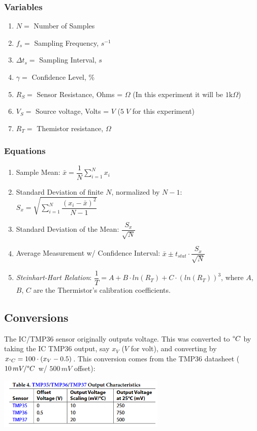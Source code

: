 \documentclass{article}
\begin{document}
\subsubsection*{Variables}
\begin{enumerate}[label = \roman*.]
    \item \(N = \) Number of Samples
    \item \(f_{s} = \) Sampling Frequency, $s^{-1}$
    \item \(\Delta t_{s} = \) Sampling Interval, $s$
    \item \(\gamma = \) Confidence Level, \%
    \item \(R_{S} = \) Sensor Resistance, Ohms = $\Omega$ (In this experiment it will be $1\text{k}\Omega$)
    \item \(V_{S} = \) Source voltage, Volts = $V$ ($5\;V$ for this experiment)
    \item \(R_{T} = \) Themistor resistance, $\Omega$
\end{enumerate}

\subsubsection*{Equations}
\begin{enumerate}[label = \Roman*.]
    \item Sample Mean: \(\bar{x} = \dfrac{1}{N}\displaystyle\sum_{i=1}^{N} x_{i}\) 
    \item Standard Deviation of finite $N$, normalized by $N-1$: \(S_{x} = \sqrt{\displaystyle\sum_{i=1}^{N} \dfrac{(x_{i} - \bar{x})^{2}}{N-1}}\)
    \item Standard Deviation of the Mean: \(\dfrac{S_{x}}{\sqrt{N}}\)
    \item Average Measurement w/ Confidence Interval: \(\bar{x} \pm t_{stat}\cdot \dfrac{S_{x}}{\sqrt{N}}\)
    \item \textit{Steinhart-Hart Relation}: \(\dfrac{1}{T} = A + B\cdot ln(R_{T}) + C\cdot (ln(R_{T}))^{3}\), where $A$, $B$, $C$ are the Thermistor's calibration coefficients.
\end{enumerate}  

\subsection*{Conversions}
The IC/TMP36 sensor originally outputs voltage. This was converted to $\degree C$ by taking the IC TMP36 output, say $x_{V}$ ($V$ for volt), and converting by $x_{\degree C} = 100\cdot(x_{V}-0.5)$. This conversion comes from the TMP36 datasheet ($10\,mV/\degree C$ w/ $500\,mV$ offset):
\begin{center}
    \href{https://www.analog.com/media/en/technical-documentation/data-sheets/tmp35_36_37.pdf}{\includegraphics[width = 0.6\textwidth]{lab2images/tmp36_offset_documentation.png}}
\end{center}
\end{document}
